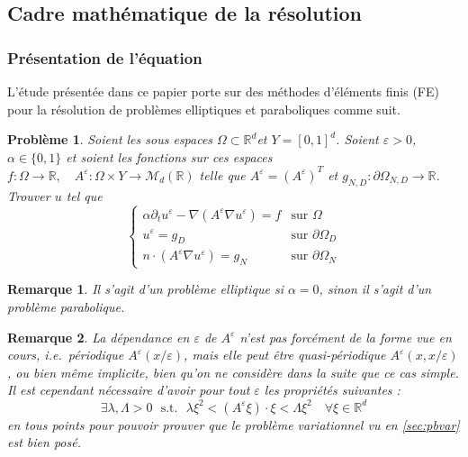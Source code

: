 \documentclass[11pt]{article}
\newtheorem{pb}{Problème}
\newtheorem{rmq}{Remarque}
\newcommand{\R}{\mathbb{R}}
\newcommand{\Ae}{A^\varepsilon}
\newcommand{\ue}{u^\varepsilon}
\newcommand{\ie}{\emph{i.e.{}}~}
\newcommand{\st}{\text{~~s.t.~~}}
\begin{document}
\subsection{Cadre mathématique de la résolution}

\subsubsection{Présentation de l'équation}

L'étude présentée dans ce papier porte sur des méthodes d'éléments finis (FE) pour la résolution de problèmes elliptiques et paraboliques comme suit.

\begin{pb}
  \label{pb:parael}
  Soient les sous espaces $\Omega \subset \R^d$\quad et \quad $Y = [0,1]^d$. Soient $\varepsilon >0$, $\alpha\in \{0, 1\}$ et soient les fonctions sur ces
  espaces $f : \Omega \to \R, \quad \Ae : \Omega\times Y \to \mathcal{M}_d(\R)$  telle que $\Ae  = (\Ae)^T$ \quad et \quad $g_{N,D} : \partial \Omega_{N, D} \to \R$. \\
  Trouver $u$ tel que
  \begin{equation*}
    \begin{cases}
      \alpha \partial_t \ue -\nabla(\Ae \nabla \ue) = f & \text{sur }\Omega\\
      \ue = g_D & \text{sur }\partial \Omega_D \\
      n\cdot(\Ae \nabla \ue) = g_N & \text{sur }\partial \Omega_N
    \end{cases}
  \end{equation*}
\end{pb}

\begin{rmq}
  Il s'agit d'un problème elliptique si $\alpha=0$, sinon il s'agit d'un problème parabolique.
\end{rmq}

\begin{rmq}
  La dépendance en $\varepsilon$ de $\Ae$ n'est pas forcément de la forme vue en cours, \ie périodique $\Ae(x/\varepsilon)$, mais elle peut être
  quasi-périodique $\Ae(x, x/\varepsilon)$, ou bien même implicite, bien qu'on ne considère dans la suite que ce cas simple. Il est cependant nécessaire
  d'avoir pour tout $\varepsilon$ les propriétés suivantes :
  \[
    \exists \lambda, \Lambda > 0 \st \lambda \xi^2 < (\Ae \xi) \cdot \xi < \Lambda \xi^2 \quad \forall \xi \in \R^d
  \]
  en tous points pour pouvoir prouver que le problème variationnel vu en \autoref{sec:pbvar} est bien posé.
\end{rmq}
\end{document}
